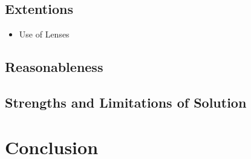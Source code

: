 \documentclass[11pt, letterpaper]{article}
\begin{document}
\subsection{Extentions}
\begin{itemize}
\item Use of Lenses	
	
\end{itemize}



\subsection{Reasonableness}


\subsection{Strengths and Limitations of Solution}


\section{Conclusion}


 
\end{document}
